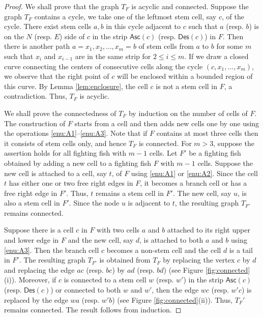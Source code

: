 \documentclass[a4paper,11pt,reqno]{amsart}
\theoremstyle{definition}
\numberwithin{equation}{section}
\newcommand{\Des}{{\textsf{Des}}}
\newcommand{\Asc}{{\textsf{Asc}}}
\begin{document}
\begin{proof} We shall prove that the graph $T_F$ is acyclic and connected.
Suppose the graph $T_F$ contains a cycle, we take one of the leftmost stem cell, say $c$, of the cycle. There exist stem cells $a,b$ in this cycle adjacent to $c$ such that $a$ (resp. $b$) is on the $N$ (resp. $E$) side of $c$ in the strip $\Asc(c)$ (resp. $\Des(c)$) in $F$. Then there is another path $a=x_1, x_2,\dots,x_m=b$ of stem cells from $a$ to $b$ for some $m$ such that $x_i$ and $x_{i-1}$ are in the same strip for $2\le i\le m$. If we draw a closed curve connecting the centers of consecutive cells along the cycle $(c, x_1,\dots, x_m)$, we observe that the right point of $c$ will be enclosed within a bounded region of this curve. By Lemma \ref{lem:enclosure}, the cell $c$ is not a stem cell in $F$, a contradiction. Thus, $T_F$ is acyclic.


We shall prove the connectedness of $T_F$ by induction on the number of cells of $F$. The construction of $F$ starts from a cell and then adds new cells one by one using the operations \ref{enu:A1}--\ref{enu:A3}. Note that if $F$ contains at most three cells then it consists of stem cells only, and hence $T_F$ is connected. For $m>3$, suppose the assertion holds for all fighting fish with $m-1$ cells. Let $F'$ be a fighting fish obtained by adding a new cell to a fighting fish $F$ with $m-1$ cells. Suppose the new cell is attached to a cell, say $t$, of $F$ using \ref{enu:A1} or \ref{enu:A2}. Since the cell $t$ has either one or two free right edges in $F$, it becomes a branch cell or has a free right edge in $F'$. Thus, $t$ remains a stem cell in $F'$. The new cell, say $u$, is also a stem cell in $F'$. Since the node $u$ is adjacent to $t$, the resulting graph $T_{F'}$ remains connected.

Suppose there is a cell $c$ in $F$ with two cells $a$ and $b$ attached to its right upper and lower edge in $F$  and the new cell, say $d$, is attached to both $a$ and $b$ using \ref{enu:A3}. Then the branch cell $c$ becomes a non-stem cell and the cell $d$ is a tail in $F'$.
The resulting graph $T_{F'}$ is obtained from $T_F$ by replacing the vertex $c$ by $d$ and replacing the edge $ac$ (resp. $bc$) by $ad$ (resp. $bd$) (see Figure \ref{fig:connected}(i)). Moreover, if $c$ is connected to a stem cell $w$ (resp. $w'$) in the strip $\Asc(c)$ (resp. $\Des(c)$) or connected to both $w$ and $w'$, then the edge $wc$ (resp. $w'c$) is replaced by the edge $wa$ (resp. $w'b$) (see Figure \ref{fig:connected}(ii)). Thus, $T_F'$ remains connected. The result follows from induction.
\end{proof}
\end{document}
